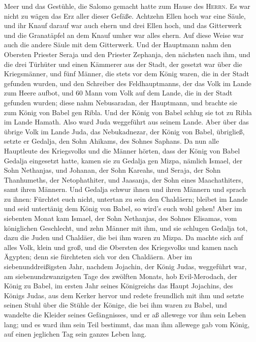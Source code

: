 Meer und das Gestühle, die Salomo gemacht hatte zum Hause des
\textsc{Herrn}. Es war nicht zu wägen das Erz aller dieser Gefäße.
 Achtzehn Ellen hoch war eine Säule, und ihr Knauf darauf
war auch ehern und drei Ellen hoch, und das Gitterwerk und die
Granatäpfel an dem Knauf umher war alles ehern. Auf diese Weise war auch
die andere Säule mit dem Gitterwerk.  Und der Hauptmann
nahm den Obersten Priester Seraja und den Priester Zephanja, den
nächsten nach ihm, und die drei Türhüter  und einen
Kämmerer aus der Stadt, der gesetzt war über die Kriegsmänner, und fünf
Männer, die stets vor dem König waren, die in der Stadt gefunden wurden,
und den Schreiber des Feldhauptmanns, der das Volk im Lande zum Heere
aufbot, und 60 Mann vom Volk auf dem Lande, die in der Stadt gefunden
wurden;  diese nahm Nebusaradan, der Hauptmann, und
brachte sie zum König von Babel gen Ribla.  Und der König
von Babel schlug sie tot zu Ribla im Lande Hamath. Also ward Juda
weggeführt aus seinem Lande.  Aber über das übrige Volk
im Lande Juda, das Nebukadnezar, der König von Babel, übrigließ, setzte
er Gedalja, den Sohn Ahikams, des Sohnes Saphans.  Da nun
alle Hauptleute des Kriegsvolks und die Männer hörten, dass der König
von Babel Gedalja eingesetzt hatte, kamen sie zu Gedalja gen Mizpa,
nämlich Ismael, der Sohn Nethanjas, und Johanan, der Sohn Kareahs, und
Seraja, der Sohn Thanhumeths, der Netophathiter, und Jaasanja, der Sohn
eines Maachathiters, samt ihren Männern.  Und Gedalja
schwur ihnen und ihren Männern und sprach zu ihnen: Fürchtet euch nicht,
untertan zu sein den Chaldäern; bleibet im Lande und seid untertänig dem
König von Babel, so wird's euch wohl gehen!  Aber im
siebenten Monat kam Ismael, der Sohn Nethanjas, des Sohnes Elisamas, vom
königlichen Geschlecht, und zehn Männer mit ihm, und sie schlugen
Gedalja tot, dazu die Juden und Chaldäer, die bei ihm waren zu Mizpa.
 Da machte sich auf alles Volk, klein und groß, und die
Obersten des Kriegsvolks und kamen nach Ägypten; denn sie fürchteten
sich vor den Chaldäern.  Aber im siebenunddreißigsten
Jahr, nachdem Jojachin, der König Judas, weggeführt war, am
siebenundzwanzigsten Tage des zwölften Monats, hob Evil-Merodach, der
König zu Babel, im ersten Jahr seines Königreichs das Haupt Jojachins,
des Königs Judas, aus dem Kerker hervor  und redete
freundlich mit ihm und setzte seinen Stuhl über die Stühle der Könige,
die bei ihm waren zu Babel,  und wandelte die Kleider
seines Gefängnisses, und er aß allewege vor ihm sein Leben lang;
 und es ward ihm sein Teil bestimmt, das man ihm allewege
gab vom König, auf einen jeglichen Tag sein ganzes Leben lang.
